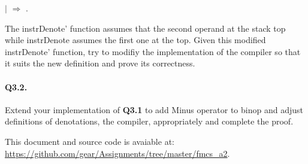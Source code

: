 \begin{coqdoccode}
\coqdocindent{8.00em}
\ensuremath{|} \coqdocvar{\_} \ensuremath{\Rightarrow} \coqdoceol
\coqdocindent{8.00em}
\coqdoceol
\coqdocindent{1.00em}
.\coqdoceol
\coqdocemptyline
\end{coqdoccode}
The instrDenote' function assumes that the second operand at the stack top while instrDenote assumes the first one at the top. Given this modified instrDenote' function, try to modifiy the implementation of the compiler so that it suits the new definition and prove its correctness. 

 \paragraph{Q3.2.} Extend your implementation of \textbf{Q3.1} to add Minus operator to binop and adjust definitions of denotations, the compiler, appropriately and complete the proof.

 \vspace{1em}  \noindent This document and source code is avaiable at: \url{https://github.com/gear/Assignments/tree/master/fmcs_a2}. \begin{coqdoccode}
\coqdocemptyline
\end{coqdoccode}
